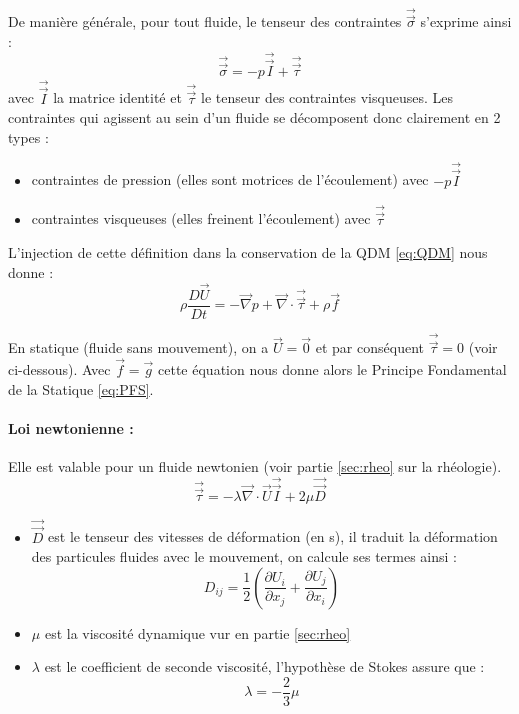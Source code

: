 
De manière générale, pour tout fluide, le tenseur des contraintes $\vec{\vec{\sigma}}$ s'exprime ainsi :
%
\begin{equation}
    \vec{\vec{\sigma}} = - p \vec{\vec{I}} + \vec{\vec{\tau}}
\end{equation}
%
avec $\vec{\vec{I}}$ la matrice identité et $\vec{\vec{\tau}}$ le tenseur des contraintes visqueuses. Les contraintes qui agissent au sein d'un fluide se décomposent donc clairement en 2 types :
%
\begin{itemize}
    \item contraintes de pression (elles sont motrices de l'écoulement) avec $- p \vec{\vec{I}}$
    \item contraintes visqueuses (elles freinent l'écoulement) avec $\vec{\vec{\tau}}$
\end{itemize}

L'injection de cette définition dans la conservation de la QDM \eqref{eq:QDM} nous donne :
%
\begin{equation}
    \rho \frac{D\vec{U}}{Dt}
    = - \vec{\nabla} p
    + \vec{\nabla} \cdot \vec{\vec{\tau}}
    + \rho \vec{f}
\end{equation}

En statique (fluide sans mouvement), on a $\vec{U} = \vec{0}$ et par conséquent $\vec{\vec{\tau}} = 0$ (voir ci-dessous). Avec $\vec{f} = \vec{g}$ cette équation nous donne alors le Principe Fondamental de la Statique \eqref{eq:PFS}.

\paragraph{Loi newtonienne :}Elle est valable pour un fluide newtonien (voir partie \ref{sec:rheo} sur la rhéologie).
%
\begin{equation}
    \vec{\vec{\tau}} = - \lambda \vec{\nabla} \cdot \vec{U} \vec{\vec{I}}
     + 2\mu \vec{\vec{D}}
\end{equation}
%
\begin{itemize}
    \item $\vec{\vec{D}}$ est le tenseur des vitesses de déformation (en s), il traduit la déformation des particules fluides avec le mouvement, on calcule ses termes ainsi :
%
    \begin{equation}
        D_{ij} = \frac{1}{2} \left( \frac{\partial{U_i}}{\partial{x_j}}
                                  + \frac{\partial{U_j}}{\partial{x_i}} \right)
    \end{equation}

    \item $\mu$ est la viscosité dynamique vur en partie \ref{sec:rheo}
    \item $\lambda$ est le coefficient de seconde viscosité, l'hypothèse de Stokes assure que :
    \begin{equation}
        \lambda = - \frac{2}{3} \mu
    \end{equation}
\end{itemize}


